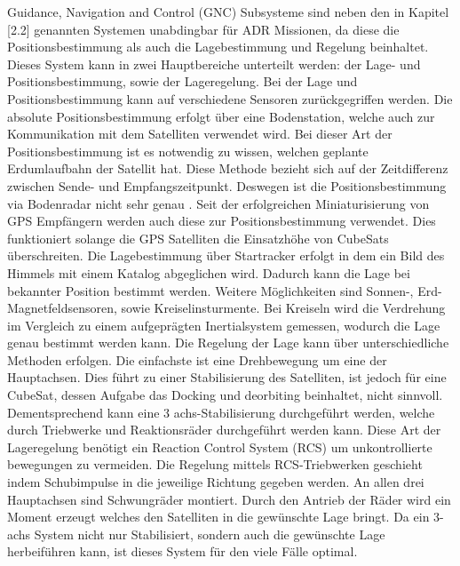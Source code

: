 		Guidance, Navigation and Control (GNC) Subsysteme sind neben den in Kapitel [2.2] genannten Systemen unabdingbar für ADR Missionen, da diese die Positionsbestimmung als auch die Lagebestimmung und Regelung beinhaltet. Dieses System kann in zwei Hauptbereiche unterteilt werden: der Lage- und Positionsbestimmung, sowie der Lageregelung.
Bei der Lage und Positionsbestimmung kann auf verschiedene Sensoren zurückgegriffen werden. Die absolute Positionsbestimmung erfolgt über eine Bodenstation, welche auch zur Kommunikation mit dem Satelliten verwendet wird. Bei dieser Art der Positionsbestimmung ist es notwendig zu wissen, welchen geplante Erdumlaufbahn der Satellit hat. Diese Methode bezieht sich auf der Zeitdifferenz zwischen Sende- und Empfangszeitpunkt. Deswegen ist die Positionsbestimmung via Bodenradar nicht sehr genau \cite{.d}. Seit der erfolgreichen Miniaturisierung  von GPS Empfängern werden auch diese zur Positionsbestimmung verwendet. Dies funktioniert solange die GPS Satelliten die Einsatzhöhe von CubeSats überschreiten. Die Lagebestimmung über Startracker erfolgt in dem ein Bild des Himmels mit einem Katalog abgeglichen wird. Dadurch kann die Lage bei bekannter Position bestimmt werden. Weitere Möglichkeiten sind Sonnen-, Erd- Magnetfeldsensoren, sowie Kreiselinsturmente. Bei Kreiseln wird die Verdrehung im Vergleich zu einem aufgeprägten Inertialsystem gemessen, wodurch die Lage genau bestimmt werden kann. 
Die Regelung  der Lage kann über unterschiedliche Methoden erfolgen. Die einfachste ist eine Drehbewegung um eine der Hauptachsen. Dies führt zu einer Stabilisierung des Satelliten, ist jedoch für eine CubeSat, dessen Aufgabe das Docking und deorbiting beinhaltet, nicht sinnvoll. Dementsprechend kann eine 3 achs-Stabilisierung durchgeführt werden, welche durch Triebwerke und Reaktionsräder durchgeführt werden kann. Diese Art der Lageregelung benötigt ein Reaction Control System (RCS) um unkontrollierte bewegungen zu vermeiden. Die Regelung mittels RCS-Triebwerken geschieht indem Schubimpulse in die jeweilige Richtung gegeben werden. An allen drei Hauptachsen sind Schwungräder montiert. Durch den Antrieb der Räder wird ein Moment erzeugt welches den Satelliten in die gewünschte Lage bringt. Da ein 3-achs System nicht nur Stabilisiert, sondern auch die gewünschte Lage herbeiführen kann, ist dieses System für den viele Fälle optimal.\cite{Lettau.}

